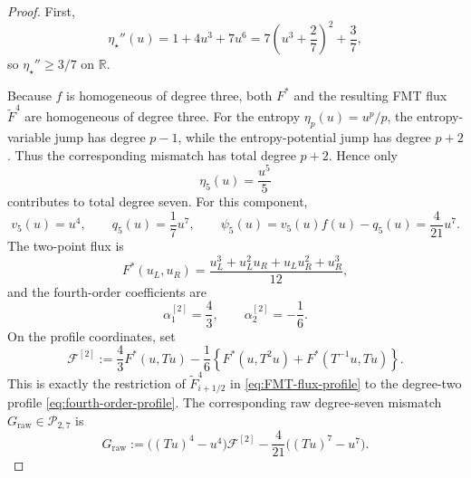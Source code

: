 \documentclass[11pt]{amsart}
\theoremstyle{plain}
\theoremstyle{definition}
\theoremstyle{remark}
\numberwithin{equation}{section}
\theoremstyle{plain}
\begin{document}
\begin{proof}
	First,
	\begin{equation}\label{eq:fourth-order-entropy-convexity}
		\eta_\star''(u)
		=1+4u^3+7u^6
		=7\left(u^3+\frac27\right)^2+\frac37,
	\end{equation}
	so $\eta_\star''\ge3/7$ on $\mathbb R$.
	
	Because $f$ is homogeneous of degree three, both $F^*$ and the resulting
	FMT flux $\widetilde F^4$ are homogeneous of degree three.  For the entropy $\eta_p(u)=u^p/p$, the
	entropy-variable jump has degree $p-1$, while the entropy-potential jump has
	degree $p+2$.  Thus the corresponding mismatch has total degree $p+2$.
	Hence only
	\[
	\eta_5(u)=\frac{u^5}{5}
	\]
	contributes to total degree seven.  For this component,
	\begin{equation}\label{eq:degree-five-entropy-data}
		v_5(u)=u^4,
		\qquad
		q_5(u)=\frac17u^7,
		\qquad
		\psi_5(u)=v_5(u)f(u)-q_5(u)=\frac4{21}u^7.
	\end{equation}
	The two-point flux is
	\begin{equation}\label{eq:cubic-two-point-flux}
		F^*(u_L,u_R)
		=\frac{u_L^3+u_L^2u_R+u_Lu_R^2+u_R^3}{12},
	\end{equation}
	and the fourth-order coefficients are
	\begin{equation}\label{eq:fourth-order-FMT-coefficients}
		\alpha_1^{[2]}=\frac43,
		\qquad
		\alpha_2^{[2]}=-\frac16.
	\end{equation}
	On the profile coordinates, set
	\begin{equation}\label{eq:fourth-order-profile-flux}
		\mathcal F^{[2]}
		:=\frac43F^*(u,Tu)
		-\frac16\left\{
		F^*(u,T^2u)+F^*(T^{-1}u,Tu)
		\right\}.
	\end{equation}
	This is exactly the restriction of $\widetilde F^4_{i+1/2}$ in
	\eqref{eq:FMT-flux-profile} to the degree-two profile
	\eqref{eq:fourth-order-profile}.
	The corresponding raw degree-seven mismatch
	$G_{\mathrm{raw}}\in\mathscr P_{2,7}$ is
	\begin{equation}\label{eq:fourth-order-raw-mismatch}
		G_{\mathrm{raw}}
		:=\bigl((Tu)^4-u^4\bigr)\mathcal F^{[2]}
		-\frac4{21}\bigl((Tu)^7-u^7\bigr).
	\end{equation}
	

\end{proof}
\end{document}

